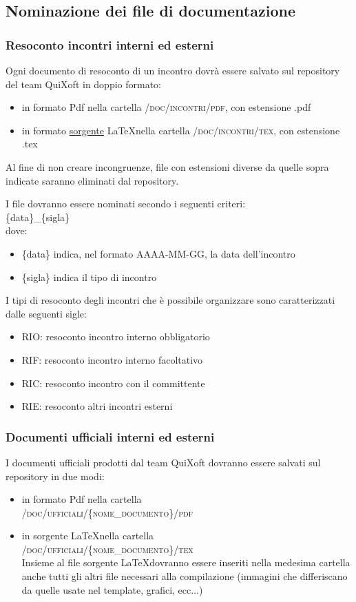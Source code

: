 \documentclass[11pt,a4paper]{article}
\begin{document}
\subsection{Nominazione dei file di documentazione}
\subsubsection{Resoconto incontri interni ed esterni}
Ogni documento di resoconto di un incontro dovrà essere salvato sul repository del team QuiXoft in doppio formato:
\begin{itemize}
	\item in formato Pdf nella cartella \textsc{/doc/incontri/pdf}, con estensione .pdf
	\item in formato \underline{sorgente} \LaTeX \space nella cartella \textsc{/doc/incontri/tex}, con estensione .tex
\end{itemize}
Al fine di non creare incongruenze, file con estensioni diverse da quelle sopra indicate saranno eliminati dal repository.

I file dovranno essere nominati secondo i seguenti criteri: \\

\{data\}\_\{sigla\} \\

dove:

\begin{itemize}
	\item \{data\} indica, nel formato AAAA-MM-GG, la data dell'incontro
	\item \{sigla\} indica il tipo di incontro
\end{itemize}
\bigskip \medskip
I tipi di resoconto degli incontri che è possibile organizzare sono caratterizzati dalle seguenti sigle:

\begin{itemize}
	\item RIO: resoconto incontro interno obbligatorio
	\item RIF: resoconto incontro interno facoltativo
	\item RIC: resoconto incontro con il committente
	\item RIE: resoconto altri incontri esterni
\end{itemize}
\subsubsection{Documenti ufficiali interni ed esterni}
I documenti ufficiali prodotti dal team QuiXoft dovranno essere salvati sul repository in due modi:
\begin{itemize}
	\item in formato Pdf nella cartella
\\ \textsc{/doc/ufficiali/\{nome\_documento\}/pdf}
	\item in sorgente \LaTeX \space nella cartella
\\ \textsc{/doc/ufficiali/\{nome\_documento\}/tex}
\\ Insieme al file sorgente \LaTeX \space dovranno essere inseriti nella medesima cartella anche tutti gli altri file necessari alla compilazione (immagini che differiscano da quelle usate nel template, grafici, ecc...)
\end{itemize}
\end{document}
